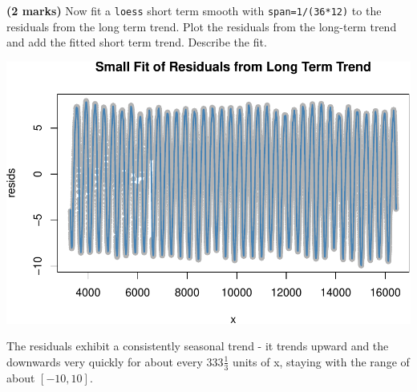 \documentclass[9pt,letter]{article}
\newenvironment{Shaded}{\begin{snugshade}}{\end{snugshade}}
\newcommand{\KeywordTok}[1]{\textcolor[rgb]{0.13,0.29,0.53}{\textbf{#1}}}
\newcommand{\DataTypeTok}[1]{\textcolor[rgb]{0.13,0.29,0.53}{#1}}
\newcommand{\DecValTok}[1]{\textcolor[rgb]{0.00,0.00,0.81}{#1}}
\newcommand{\StringTok}[1]{\textcolor[rgb]{0.31,0.60,0.02}{#1}}
\newcommand{\OperatorTok}[1]{\textcolor[rgb]{0.81,0.36,0.00}{\textbf{#1}}}
\newcommand{\NormalTok}[1]{#1}
\begin{document}
\item 

\textbf{(2 marks)} Now fit a \texttt{loess} short term smooth with
\texttt{span=1/(36*12)} to the residuals from the long term trend. Plot
the residuals from the long-term trend and add the fitted short term
trend. Describe the fit.

\begin{Shaded}
\end{Shaded}

\begin{center}\includegraphics{a4_solutions_files/figure-latex/unnamed-chunk-28-1} \end{center}

The residuals exhibit a consistently seasonal trend - it trends upward
and the downwards very quickly for about every \(333\frac{1}{3}\) units
of x, staying with the range of about \([-10, 10]\).
\end{document}
